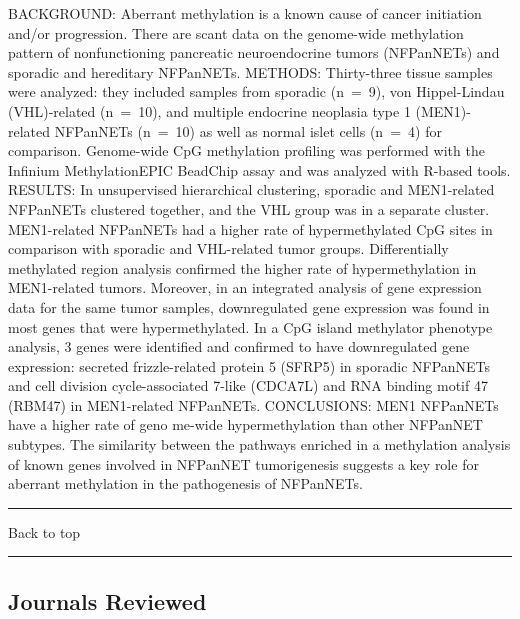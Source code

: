 \documentclass[]{article}
\begin{document}
BACKGROUND: Aberrant methylation is a known cause of cancer initiation
and/or progression. There are scant data on the genome-wide methylation
pattern of nonfunctioning pancreatic neuroendocrine tumors (NFPanNETs)
and sporadic and hereditary NFPanNETs. METHODS: Thirty-three tissue
samples were analyzed: they included samples from sporadic (n~=~9), von
Hippel-Lindau (VHL)-related (n~=~10), and multiple endocrine neoplasia
type 1 (MEN1)-related NFPanNETs (n~=~10) as well as normal islet cells
(n~=~4) for comparison. Genome-wide CpG methylation profiling was
performed with the Infinium MethylationEPIC BeadChip assay and was
analyzed with R-based tools. RESULTS: In unsupervised hierarchical
clustering, sporadic and MEN1-related NFPanNETs clustered together, and
the VHL group was in a separate cluster. MEN1-related NFPanNETs had a
higher rate of hypermethylated CpG sites in comparison with sporadic and
VHL-related tumor groups. Differentially methylated region analysis
confirmed the higher rate of hypermethylation in MEN1-related tumors.
Moreover, in an integrated analysis of gene expression data for the same
tumor samples, downregulated gene expression was found in most genes
that were hypermethylated. In a CpG island methylator phenotype
analysis, 3 genes were identified and confirmed to have downregulated
gene expression: secreted frizzle-related protein 5 (SFRP5) in sporadic
NFPanNETs and cell division cycle-associated 7-like (CDCA7L) and RNA
binding motif 47 (RBM47) in MEN1-related NFPanNETs. CONCLUSIONS: MEN1
NFPanNETs have a higher rate of geno me-wide hypermethylation than other
NFPanNET subtypes. The similarity between the pathways enriched in a
methylation analysis of known genes involved in NFPanNET tumorigenesis
suggests a key role for aberrant methylation in the pathogenesis of
NFPanNETs.

{}

{}

\begin{center}\rule{0.5\linewidth}{\linethickness}\end{center}

Back to top

\begin{center}\rule{0.5\linewidth}{\linethickness}\end{center}

\pagebreak

\hypertarget{journals-reviewed}{%
\subsection{Journals Reviewed}\label{journals-reviewed}}
\end{document}
